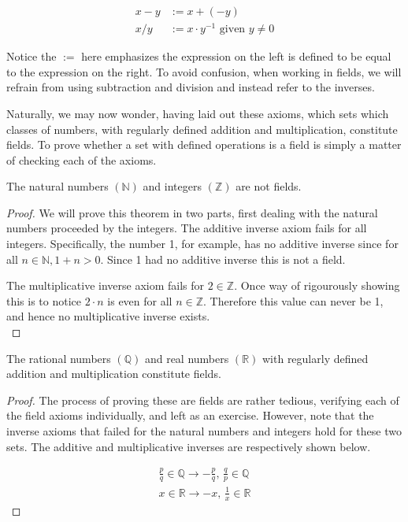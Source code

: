 \begin{align}
	x - y &:= x + (-y) \\
	x / y &:= x \cdot y^{-1} \text{ given } y \neq 0
\end{align}

Notice the $:=$ here emphasizes the expression on the left is defined to be equal to the expression on the right. To avoid confusion, when working in fields, we will refrain from using subtraction and division and instead refer to the inverses.

Naturally, we may now wonder, having laid out these axioms, which sets which classes of numbers, with regularly defined addition and multiplication, constitute fields. To prove whether a set with defined operations is a field is simply a matter of checking each of the axioms. \\

\vspace{\baselineskip}
\begin{theorem}
	The natural numbers $(\mathbb{N})$ and integers $(\mathbb{Z})$ are not fields. 
\end{theorem}

\begin{proof} 
	We will prove this theorem in two parts, first dealing with the natural numbers proceeded by the integers.
	The additive inverse axiom fails for all integers. Specifically, the number 1, for example, has no additive inverse since for all $n \in \mathbb{N}, 1 + n > 0$. Since 1 had no additive inverse this is not a field.
	
	The multiplicative inverse axiom fails for $2 \in \mathbb{Z}$. Once way of rigourously showing this is to notice $2 \cdot n$ is even for all $n \in \mathbb{Z}$. Therefore this value can never be 1, and hence no multiplicative inverse exists. \\
\end{proof}
\vspace{\baselineskip}

\vspace{\baselineskip}
\begin{theorem}
	The rational numbers $(\mathbb{Q})$ and real numbers $(\mathbb{R})$ with regularly defined addition and multiplication constitute fields.
\end{theorem}

\begin{proof}
	The process of proving these are fields are rather tedious, verifying each of the field axioms individually, and left as an exercise. However, note that the inverse axioms that failed for the natural numbers and integers hold for these two sets. The additive and multiplicative inverses are respectively shown below.
	
	\begin{align*}
		\frac{p}{q} \in \mathbb{Q} \rightarrow -\frac{p}{q}, \, \frac{q}{p} \in \mathbb{Q} \\
		x \in \mathbb{R} \rightarrow -x, \, \frac{1}{x} \in \mathbb{R}
	\end{align*}
\end{proof}
\vspace{\baselineskip}

